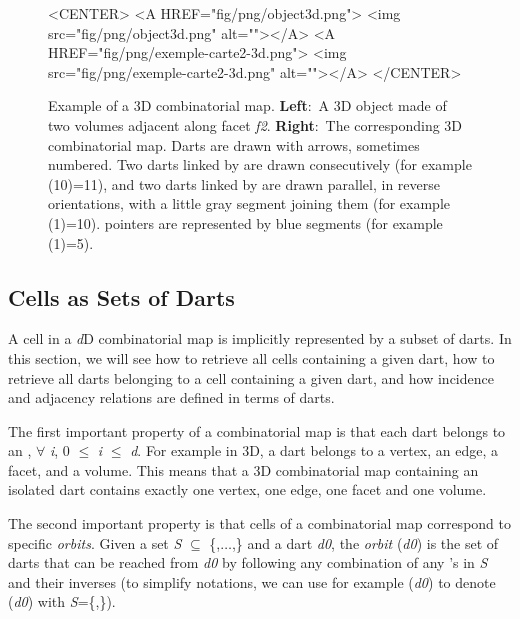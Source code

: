 \begin{figure}
  \begin{ccHtmlOnly}
    <CENTER>
    <A HREF="fig/png/object3d.png">
    <img src="fig/png/object3d.png" alt=""></A>
    <A HREF="fig/png/exemple-carte2-3d.png">
        <img src="fig/png/exemple-carte2-3d.png" alt=""></A>
    </CENTER>
    \end{ccHtmlOnly}
    \caption{Example of a 3D combinatorial map. \textbf{Left}:~A 3D object
      made of two volumes adjacent along facet \emph{f2}. \textbf{Right}:~The
      corresponding 3D combinatorial map.  Darts are drawn with
      arrows, sometimes numbered.  Two darts linked by \betaun{} are
      drawn consecutively (for example \betaun{}(10)=11), and two
      darts linked by \betadeux{} are drawn parallel, in reverse
      orientations, with a little gray segment joining them (for
      example \betadeux{}(1)=10).  \betatrois{} pointers are represented by
      blue segments (for example \betatrois{}(1)=5).}
    \label{fig-exemple-carte3d}
\end{figure}

\subsection{Cells as Sets of Darts}\label{ssec-cells-in-map}
A cell in a \emph{d}D combinatorial map is implicitly represented by a
subset of darts.
In this section, we will see how to retrieve all cells containing a
given dart, how to retrieve all darts belonging to a cell containing a
given dart, and how incidence and adjacency relations are defined in
terms of darts.

The first important property of a combinatorial map is that
each dart belongs to an , $\forall$ \emph{i}, 0 $\leq$ \emph{i} $\leq$ \emph{d}.
For example in 3D, a dart belongs to a vertex, an edge, a facet, and a
volume. This means that a 3D combinatorial map containing an isolated
dart contains exactly one vertex, one edge, one facet and one volume.


The second important property is that cells of a combinatorial map
correspond to specific \emph{orbits}.  Given a set 
\emph{S} $\subseteq$ \{\betaun{},$\ldots$,\betad{}\} and a dart
\emph{d0}, the \emph{orbit} (\emph{d0}) is the set of darts that can be
reached from \emph{d0} by following any combination of any \betai{}'s in \emph{S}
and their inverses (to simplify notations, we can use for example
\orbit{\betaun{},\betaquatre{}}(\emph{d0}) to denote (\emph{d0}) with
\emph{S}=\{\betaun{},\betaquatre{}\}).

